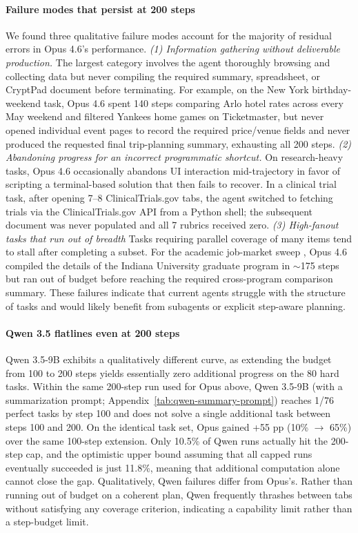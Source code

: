 \documentclass{article}
\theoremstyle{plain}
\theoremstyle{definition}
\theoremstyle{remark}
\begin{document}
\paragraph{Failure modes that persist at 200 steps}
We found three qualitative failure modes account for the majority of residual errors in Opus 4.6's performance.
\textit{(1) Information gathering without deliverable production.} The largest category involves the agent thoroughly browsing and collecting data but never compiling the required summary, spreadsheet, or CryptPad document before terminating. For example, on the New York birthday-weekend task, Opus 4.6 spent 140 steps comparing Arlo hotel rates across every May weekend and filtered Yankees home games on Ticketmaster, but never opened individual event pages to record the required price/venue fields and never produced the requested final trip-planning summary, exhausting all 200 steps.
\textit{(2) Abandoning progress for an incorrect programmatic shortcut.} On research-heavy tasks, Opus 4.6 occasionally abandons UI interaction mid-trajectory in favor of scripting a terminal-based solution that then fails to recover. In a clinical trial task, after opening 7--8 ClinicalTrials.gov tabs, the agent switched to fetching trials via the ClinicalTrials.gov API from a Python shell; the subsequent document was never populated and all 7 rubrics received zero. \textit{(3) High-fanout tasks that run out of breadth} Tasks requiring parallel coverage of many items tend to stall after completing a subset. For the academic job-market sweep , Opus 4.6 compiled the details of the Indiana University graduate program in $\sim$175 steps but ran out of budget before reaching the required cross-program comparison summary. These failures indicate that current agents struggle with the structure of tasks and would likely benefit from subagents or explicit step-aware planning.

\paragraph{Qwen 3.5 flatlines even at 200 steps}
Qwen 3.5-9B exhibits a qualitatively different curve, as extending the budget from 100 to 200 steps yields essentially zero additional progress on the 80 hard tasks. Within the same 200-step run used for Opus above, Qwen 3.5-9B (with a summarization prompt; Appendix~\ref{tab:qwen-summary-prompt}) reaches 1/76 perfect tasks by step 100 and does not solve a single additional task between steps 100 and 200. On the identical task set, Opus gained +55 pp (10\% $\to$ 65\%) over the same 100-step extension. Only 10.5\% of Qwen runs actually hit the 200-step cap, and the optimistic upper bound assuming that all capped runs eventually succeeded is just 11.8\%, meaning that additional computation alone cannot close the gap. Qualitatively, Qwen failures differ from Opus's. Rather than running out of budget on a coherent plan, Qwen frequently thrashes between tabs without satisfying any coverage criterion, indicating a capability limit rather than a step-budget limit.
\end{document}
